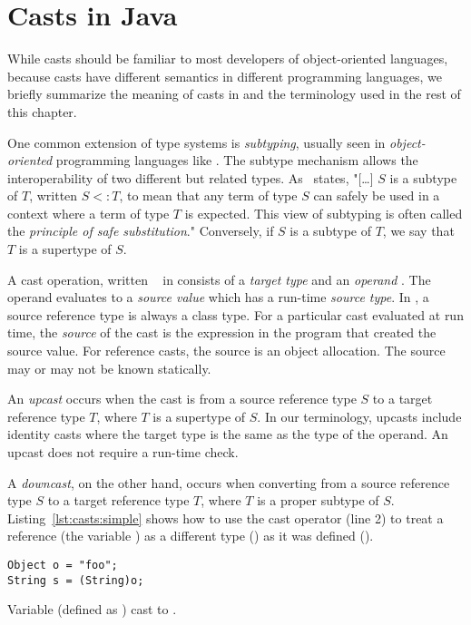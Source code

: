 \section{Casts in Java}\label{sec:casts:background}

While casts should be familiar to most developers of object-oriented languages,
because casts have different semantics in different programming languages,
we briefly summarize the meaning of casts in \java{} and the terminology used in the rest of this chapter.

One common extension of type systems is \emph{subtyping},
usually seen in \emph{object-oriented} programming languages like \java{}.
The subtype mechanism allows the interoperability of two different but related types.
As~\cite{pierceTypesProgrammingLanguages2002} states,
"[\ldots] $S$ is a subtype of $T$, written $S <: T$,
to mean that any term of type $S$ can safely be used in a context where a term of type $T$ is expected.
This view of subtyping is often called the \emph{principle of safe substitution}."
Conversely, if $S$ is a subtype of $T$, we say that $T$ is a supertype of $S$.

A cast operation, written ~ in \java{}
consists of a \emph{target type}  and an \emph{operand} .
The operand evaluates to a \emph{source value} which has a run-time
\emph{source type}.
In \java{}, a source reference type is always a class type.
For a particular cast evaluated at run time, 
the \emph{source} of the cast is the expression in the program that
created the source value.
For reference casts, the source is an object allocation.
The source may or may not be known statically.

An \emph{upcast} occurs when the cast is from a source reference type $S$ to a target reference type $T$,
where $T$ is a supertype of $S$.
In our terminology, upcasts include identity casts where the target type
is the same as the type of the operand.
An upcast does not require a run-time check.

A \emph{downcast}, on the other hand,
occurs when converting from a source reference type $S$ to a target reference
type $T$, where $T$ is a proper subtype of $S$.
Listing~\ref{lst:casts:simple} shows how to use the cast operator (line 2) to treat a reference (the variable ) as a different type () as it was defined ().

\begin{listing}
\begin{verbatim}
Object o = "foo"; 
String s = (String)o;
\end{verbatim}
\caption{Variable  (defined as ) cast to .}
\label{lst:casts:simple}
\end{listing}

